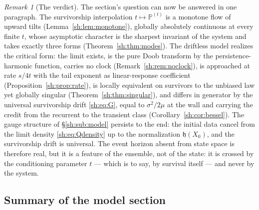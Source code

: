 \documentclass[11pt]{article}
\numberwithin{equation}{section}
\theoremstyle{plain}
\theoremstyle{definition}
\theoremstyle{remark}
\newtheorem{remark}[theorem]{Remark}
\newcommand{\PP}{\mathbb{P}}
\newcommand{\hm}{\mathfrak{h}}
\begin{document}
\begin{remark}[The verdict]\label{sh:rem:verdict}
The section's question can now be answered in one paragraph. The
survivorship interpolation $t\mapsto\PP^{(t)}$ is a monotone flow of
upward tilts (Lemma~\ref{sh:lem:monotone}), globally absolutely
continuous at every finite $t$, whose asymptotic character is the
sharpest invariant of the system and takes exactly three forms
(Theorem~\ref{sh:thm:modes}). The driftless model realizes the critical
form: the limit exists, is the pure Doob transform by the
persistence-harmonic function, carries no clock
(Remark~\ref{sh:rem:noclock}), is approached at rate $s/4t$ with the tail
exponent as linear-response coefficient
(Proposition~\ref{sh:prop:rate}), is locally equivalent on survivors to
the unbiased law yet globally singular
(Theorem~\ref{sh:thm:singular}), and differs in generator by the
universal survivorship drift \eqref{sh:eq:G}, equal to $\sigma^2/2\mu$
at the wall and carrying the credit from the recurrent to the transient
class (Corollary~\ref{sh:cor:bessel}). The gauge structure of
\S\ref{sh:sub:model} persists to the end: the initial data cancel from
the limit density \eqref{sh:eq:Qdensity} up to the normalization
$\hm(X_0)$, and the survivorship drift is universal. The event horizon
absent from state space is therefore real, but it is a feature of the
ensemble, not of the state: it is crossed by the conditioning parameter
$t$ --- which is to say, by survival itself --- and never by the system.
\end{remark}

\subsection*{Summary of the model section}

\end{document}
